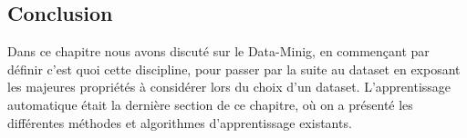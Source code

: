 \subsection{Conclusion}
Dans ce chapitre nous avons discuté sur le Data-Minig, en commençant par définir c'est quoi cette discipline, pour passer par la suite au dataset en exposant les majeures propriétés à considérer lors du choix d'un dataset. L'apprentissage automatique était la dernière section de ce chapitre, où on a présenté les différentes méthodes et algorithmes d'apprentissage existants. 